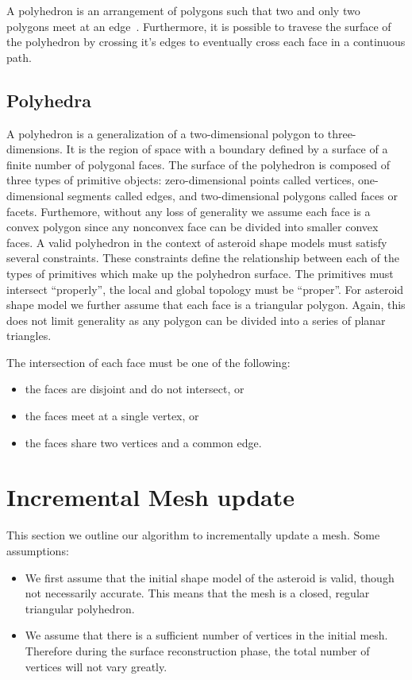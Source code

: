 A \gls{polyhedron} is an arrangement of \glspl{polygon} such that two and only two \glspl{polygon} meet at an edge~\cite{mortenson1997}.
Furthermore, it is possible to travese the surface of the \gls{polyhedron} by crossing it's edges to eventually cross each face in a continuous path.

\subsection{Polyhedra}

A polyhedron is a generalization of a two-dimensional polygon to three-dimensions.
It is the region of space with a boundary defined by a surface of a finite number of polygonal faces.
The surface of the polyhedron is composed of three types of primitive objects: zero-dimensional points called vertices, one-dimensional segments called edges, and two-dimensional polygons called faces or facets.
Furthemore, without any loss of generality we assume each face is a convex polygon since any nonconvex face can be divided into smaller convex faces.
A valid polyhedron in the context of asteroid shape models must satisfy several constraints.
These constraints define the relationship between each of the types of primitives which make up the polyhedron surface.
The primitives must intersect ``properly'', the local and global topology must be ``proper''.
For asteroid shape model we further assume that each face is a triangular polygon. 
Again, this does not limit generality as any polygon can be divided into a series of planar triangles.

The intersection of each face must be one of the following:
\begin{itemize}
    \item the faces are disjoint and do not intersect, or
    \item the faces meet at a single vertex, or
    \item the faces share two vertices and a common edge.
\end{itemize}

\section{Incremental Mesh update}

This section we outline our algorithm to incrementally update a mesh. 
Some assumptions:

\begin{itemize}
    \item We first assume that the initial shape model of the asteroid is valid, though not necessarily accurate.
        This means that the mesh is a closed, regular triangular polyhedron.
    \item We assume that there is a sufficient number of vertices in the initial mesh. 
        Therefore during the surface reconstruction phase, the total number of vertices will not vary greatly.
\end{itemize}

